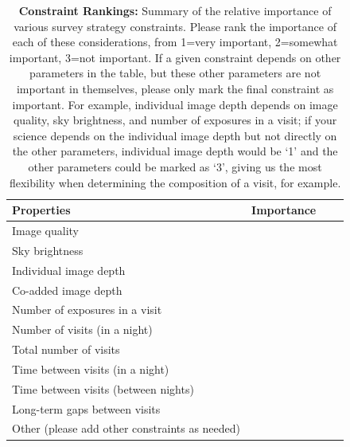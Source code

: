 \documentclass[11pt]{article}
\begin{document}
\vspace{.3in}

\begin{table}[ht]
    \centering
    \begin{tabular}{l|l|l|l}
        \toprule
        Properties & Importance \hspace{.3in} \\
        \midrule
        Image quality &     \\
        Sky brightness &  \\
        Individual image depth &   \\
        Co-added image depth &   \\
        Number of exposures in a visit   &   \\
        Number of visits (in a night)  &   \\ 
        Total number of visits &   \\
        Time between visits (in a night) &  \\
        Time between visits (between nights)  &   \\
        Long-term gaps between visits & \\
        Other (please add other constraints as needed) & \\
        \bottomrule
    \end{tabular}
    \caption{{\bf Constraint Rankings:} Summary of the relative importance of various survey strategy constraints. Please rank the importance of each of these considerations, from 1=very important, 2=somewhat important, 3=not important. If a given constraint depends on other parameters in the table, but these other parameters are not important in themselves, please only mark the final constraint as important. For example, individual image depth depends on image quality, sky brightness, and number of exposures in a visit; if your science depends on the individual image depth but not directly on the other parameters, individual image depth would be `1' and the other parameters could be marked as `3', giving us the most flexibility when determining the composition of a visit, for example.}
        \label{tab:obs_constraints}
\end{table}
\end{document}
